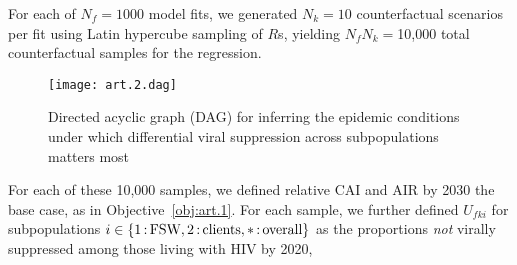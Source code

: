 For each of $N_f = 1000$ model fits,
we generated $N_k = 10$ counterfactual scenarios per fit
using Latin hypercube sampling \cite{Stein1987} of $R$s,
yielding $N_f N_k = {}$10,000 total counterfactual samples for the regression.
\begin{figure}
  \centering\texttt{[image: art.2.dag]}
  \caption{Directed acyclic graph (DAG) for inferring
    the epidemic conditions under which
    differential viral suppression across subpopulations matters most}
  \label{fig:art.2.dag}
\end{figure}
\par
For each of these 10,000 samples, we defined
relative CAI and AIR by 2030 \vs the base case, as in Objective~\ref{obj:art.1}.
For each sample, we further defined
$U_{fki}$ for subpopulations $i \in \{1{\,:\,}\textnormal{FSW}, 2{\,:\,}\textnormal{clients}, *{\,:\,}\textnormal{overall}\}$
as the proportions \emph{not} virally suppressed among those living with HIV by 2020,

